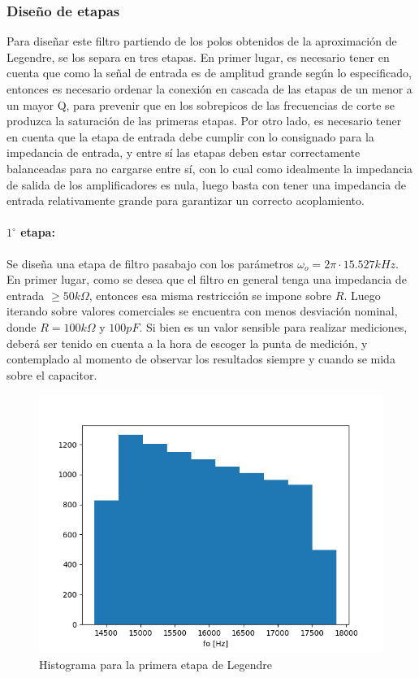 \subsubsection{Dise\~no de etapas}
Para dise\~nar este filtro partiendo de los polos obtenidos de la aproximaci\'on de Legendre, se los separa en tres etapas. En primer lugar, es necesario tener en cuenta que como la se\~nal de entrada
es de amplitud grande seg\'un lo especificado, entonces es necesario ordenar la conexi\'on en cascada de las etapas de un menor a un mayor Q, para prevenir que en los sobrepicos de las frecuencias de corte
se produzca la saturaci\'on de las primeras etapas. Por otro lado, es necesario tener en cuenta que la etapa de entrada debe cumplir con lo consignado para la impedancia de entrada,
y entre s\'i las etapas deben estar correctamente balanceadas para no cargarse entre s\'i, con lo cual como idealmente la impedancia de salida de los amplificadores es nula, luego basta con tener una impedancia de entrada
relativamente grande para garantizar un correcto acoplamiento.

\paragraph{$1^{\circ}$ etapa:} Se dise\~na una etapa de filtro pasabajo con los par\'ametros $\omega_o = 2 \pi \cdot 15.527 kHz$. En primer lugar, como se desea que el filtro en general tenga una impedancia de entrada $\geq 50k \Omega$, entonces
esa misma restricci\'on se impone sobre $R$. Luego iterando sobre valores comerciales se encuentra con menos desviaci\'on nominal, donde $R = 100k \Omega$ y $100pF$. Si bien es un valor sensible para realizar mediciones, deber\'a ser tenido en cuenta
a la hora de escoger la punta de medici\'on, y contemplado al momento de observar los resultados siempre y cuando se mida sobre el capacitor.

\begin{figure}[H]
	\centering
	\includegraphics[scale=0.7]{../EJ1/Recursos/legendre_histogram_one.png}
	\caption{Histograma para la primera etapa de Legendre}
	\label{fig:legendre_histogram_one}
\end{figure}

